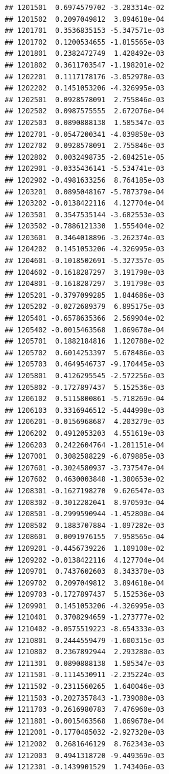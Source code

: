 \begin{frame}[fragile]
\begin{verbatim}
## 1201501  0.6974579702 -3.283314e-02
## 1201502  0.2097049812  3.894618e-04
## 1201701  0.3536835153 -5.347571e-03
## 1201702  0.1200534655 -1.815565e-03
## 1201801  0.2382472749  1.428492e-03
## 1201802  0.3611703547 -1.198201e-02
## 1202201  0.1117178176 -3.052978e-03
## 1202202  0.1451053206 -4.326995e-03
## 1202501  0.0928578091  2.755846e-03
## 1202502  0.0987575555  2.672076e-04
## 1202503  0.0890888138  1.585347e-03
## 1202701 -0.0547200341 -4.039858e-03
## 1202702  0.0928578091  2.755846e-03
## 1202802  0.0032498735 -2.684251e-05
## 1202901 -0.0335436141 -5.534741e-03
## 1202902 -0.4981633256  8.764185e-03
## 1203201  0.0895048167 -5.787379e-04
## 1203202 -0.0138422116  4.127704e-04
## 1203501  0.3547535144 -3.682553e-03
## 1203502 -0.7886121330  1.555404e-02
## 1203601  0.3464018896 -3.262374e-03
## 1204202  0.1451053206 -4.326995e-03
## 1204601 -0.1018502691 -5.327357e-05
## 1204602 -0.1618287297  3.191798e-03
## 1204801 -0.1618287297  3.191798e-03
## 1205201 -0.3797099285  1.844686e-03
## 1205202 -0.0272689379  6.895175e-03
## 1205401 -0.6578635366  2.569904e-02
## 1205402 -0.0015463568  1.069670e-04
## 1205701  0.1882184816  1.120788e-02
## 1205702  0.6014253397  5.678486e-03
## 1205703  0.4649546737 -9.170445e-03
## 1205801  0.4126295545 -2.572256e-03
## 1205802 -0.1727897437  5.152536e-03
## 1206102  0.5115800861 -5.718269e-04
## 1206103  0.3316946512 -5.444998e-03
## 1206201 -0.0156968687  4.203279e-03
## 1206202  0.4912053203  4.551619e-03
## 1206203  0.2422604764 -1.281151e-04
## 1207001  0.3082588229 -6.079885e-03
## 1207601 -0.3024580937 -3.737547e-04
## 1207602  0.4630003848 -1.380653e-02
## 1208301 -0.1627198270  9.626547e-03
## 1208302 -0.3012282041  8.970593e-04
## 1208501 -0.2999590944 -1.452800e-04
## 1208502  0.1883707884 -1.097282e-03
## 1208601  0.0091976155  7.958565e-04
## 1209201 -0.4456739226  1.109100e-02
## 1209202 -0.0138422116  4.127704e-04
## 1209701  0.7437602603  8.343370e-03
## 1209702  0.2097049812  3.894618e-04
## 1209703 -0.1727897437  5.152536e-03
## 1209901  0.1451053206 -4.326995e-03
## 1210401  0.3708294659 -1.273777e-02
## 1210402 -0.0575519223 -8.654333e-03
## 1210801  0.2444559479 -1.600315e-03
## 1210802  0.2367892944  2.293280e-03
## 1211301  0.0890888138  1.585347e-03
## 1211501 -0.1114530911 -2.235224e-03
## 1211502 -0.2311560265  1.640046e-03
## 1211503 -0.2027357843 -1.739080e-03
## 1211703 -0.2616980783  7.476960e-03
## 1211801 -0.0015463568  1.069670e-04
## 1212001 -0.1770485032 -2.927328e-03
## 1212002  0.2681646129  8.762343e-03
## 1212003  0.4941318720 -9.449369e-03
## 1212301 -0.1439901529  1.743406e-03

\end{verbatim}
\end{frame}

